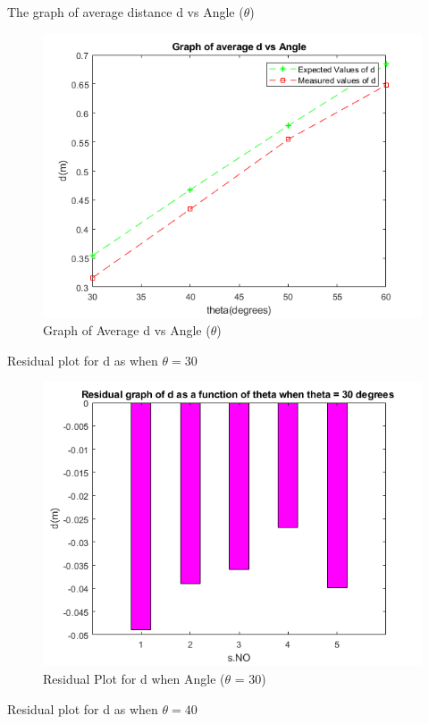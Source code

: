\newpage
The graph of average distance d  vs Angle ($\theta$)
\begin{figure}[h!]
    \centering
    \includegraphics[width=\textwidth]{figures/Avg_d_vs_theta.png}
    \caption{Graph of Average d vs Angle ($\theta$)}
    \label{fig:yx}
\end{figure}
\newpage
Residual plot for d as when $\theta = 30 $
\begin{figure}[h!]
    \centering
    \includegraphics[width=\textwidth]{figures/d_A1_r.png}
    \caption{Residual Plot for  d when Angle ($\theta$ = 30)}
    \label{fig:yx}
\end{figure}
\newpage
Residual plot for d as when $\theta = 40 $
